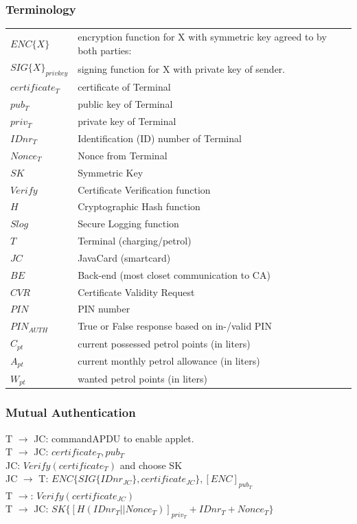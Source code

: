 \subsubsection{Terminology}
	\begin{tabular}{*{2}{l}}
	 $ENC\{X\}$ & encryption function for X with symmetric key agreed to by both parties:\\
	 $SIG\{X\}_{privkey}$ & signing function for X with private key of sender. \\
	 $certificate_{T}$ & certificate of Terminal \\
	 $pub_{T}$ & public key of Terminal \\
 	 $priv_{T}$ & private key of Terminal  \\
	 $IDnr_{T}$ & Identification (ID) number of Terminal \\
	 $Nonce_{T}$ & Nonce from Terminal \\
	 $SK$ & Symmetric Key \\
	 $Verify$ & Certificate Verification function \\
	 $H$ & Cryptographic Hash function \\
	 $Slog$ & Secure Logging function \\
	 $T$ & Terminal (charging/petrol) \\
	 $JC$ & JavaCard (smartcard) \\
	 $BE$ & Back-end (most closet communication to CA)\\
	 $CVR$ & Certificate Validity Request \\
	 $PIN$ & PIN number \\
	 $PIN_{AUTH}$ & True or False response based on in-/valid PIN \\
	 $C_{pt}$ & current possessed petrol points (in liters) \\
	 $A_{pt}$ & current monthly petrol allowance (in liters) \\
	 $W_{pt}$ & wanted petrol points (in liters) \\

	\end{tabular} 
	
\subsubsection{Mutual Authentication}
T $\to$ JC: commandAPDU to enable applet.\\
T $\to$ JC: $certificate_{T}, pub_{T}$\\
JC: $Verify(certificate_{T})$ and choose SK\\
JC $\to$ T: $ENC\{SIG\{IDnr_{JC}\}, certificate_{JC}\},  [ENC]_{pub_T}$\\
T $\to$: $Verify(certificate_{JC})$\\
T $\to$ JC: $SK\{[H(IDnr_{T}||Nonce_{T})]_{priv_T}+IDnr_{T}+Nonce_{T}\}$

